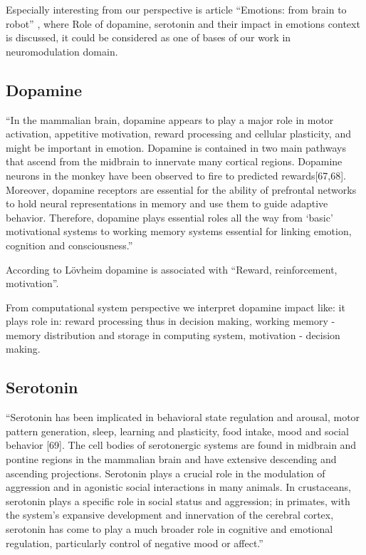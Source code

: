 Especially interesting from our perspective is article ``Emotions: from brain to robot'' \cite{emotionsbraintorobot}, where Role of dopamine, serotonin and their impact in emotions context is discussed, it could be considered as one of bases of our work in neuromodulation domain.

\subsection{Dopamine}

``In the mammalian brain, dopamine appears to play a major role in motor activation, appetitive motivation, reward processing and cellular plasticity, and might be important in emotion. Dopamine is contained in two main pathways that ascend from the midbrain to innervate many cortical regions. Dopamine neurons in the monkey have been observed to fire to predicted rewards[67,68]. Moreover, dopamine receptors are essential for the ability of prefrontal networks to hold neural representations in memory and use them to guide adaptive behavior. Therefore, dopamine plays essential roles all the way from ‘basic’ motivational systems to working memory systems essential for linking emotion, cognition and consciousness.''

According to L\"{o}vheim \cite{cubeofemotions} dopamine is associated with ``Reward, reinforcement, motivation''.

From computational system perspective we interpret dopamine impact like: it plays role in: reward processing thus in decision making, working memory - memory distribution and storage in computing system, motivation - decision making.

\subsection{Serotonin}

``Serotonin has been implicated in behavioral state regulation and arousal, motor pattern generation, sleep, learning and plasticity, food intake, mood and social behavior [69]. The cell bodies of serotonergic systems are found in midbrain and pontine regions in the mammalian brain and have extensive descending and ascending projections. Serotonin plays a crucial role in the modulation of aggression and in agonistic social interactions in many animals. In crustaceans, serotonin plays a specific role in social status and aggression; in primates, with the system’s expansive development and innervation of the cerebral cortex, serotonin has come to play a much broader role in cognitive and emotional regulation, particularly control of negative mood or affect.''

